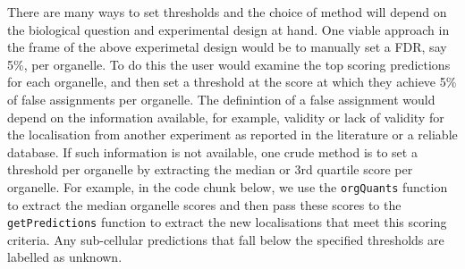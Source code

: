 There are many ways to set thresholds and the choice of method will
depend on the biological question and experimental design at hand. One
viable approach in the frame of the above experimetal design would be
to manually set a FDR, say 5\%, per organelle. To do this the user
would examine the top scoring predictions for each organelle, and then
set a threshold at the score at which they achieve 5\% of false
assignments per organelle.  The definintion of a false assignment
would depend on the information available, for example, validity or
lack of validity for the localisation from another experiment as
reported in the literature or a reliable database.  If such
information is not available, one crude method is to set a threshold
per organelle by extracting the median or 3rd quartile score per
organelle.  For example, in the code chunk below, we use the
\texttt{orgQuants} function to extract the median organelle scores and
then pass these scores to the \texttt{getPredictions} function to
extract the new localisations that meet this scoring criteria. Any
sub-cellular predictions that fall below the specified thresholds are
labelled as unknown.

